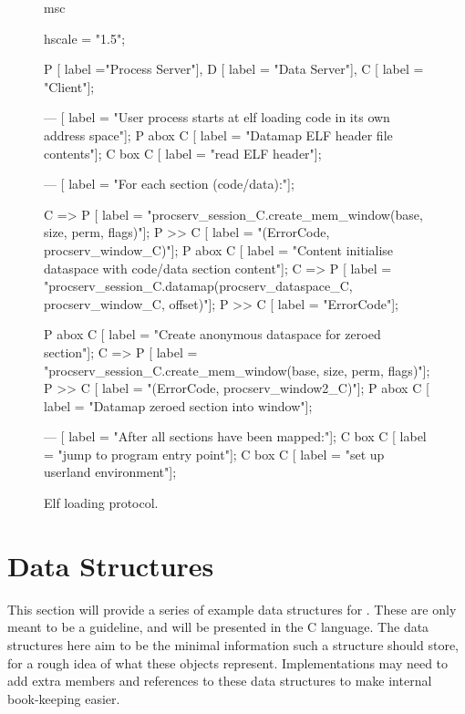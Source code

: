 \begin{figure}[htb]
  \begin{center}
    \begin{msc}
      msc {
        hscale = "1.5";
        
        P [ label ="Process Server"],
        D [ label = "Data Server"],
        C [ label = "Client"];
        
        --- [ label = "User process starts at elf loading code in its own address space"];
        P abox C [ label = "Datamap ELF header file contents"];
        C box C [ label = "read ELF header"];

        --- [ label = "For each section (code/data):"];
        
        C => P [ label = "procserv\_session\_C.create\_mem\_window(base, size, perm, flags)"];
        P >> C [ label = "(ErrorCode, procserv\_window\_C)"];
        P abox C [ label = "Content initialise dataspace with code/data section content"];
        C => P [ label = "procserv\_session\_C.datamap(procserv\_dataspace\_C, procserv\_window\_C, offset)"];
        P >> C [ label = "ErrorCode"];

        P abox C [ label = "Create anonymous dataspace for zeroed section"];
        C => P [ label = "procserv\_session\_C.create\_mem\_window(base, size, perm, flags)"];
        P >> C [ label = "(ErrorCode, procserv\_window2\_C)"];
        P abox C [ label = "Datamap zeroed section into window"];

        --- [ label = "After all sections have been mapped:"];
        C box C [ label = "jump to program entry point"];
        C box C [ label = "set up userland environment"];
      }
    \end{msc}
  \end{center}
  \caption{Elf loading protocol.}
  \label{f:elfloading}
\end{figure}

\clearpage
\section{Data Structures}

This section will provide a series of example data structures for . These are only meant to be
a guideline, and will be presented in the C language. The data structures here aim to be the minimal
information such a structure should store, for a rough idea of what these objects represent.
Implementations may need to add extra members and references to these data structures to make
internal book-keeping easier.

